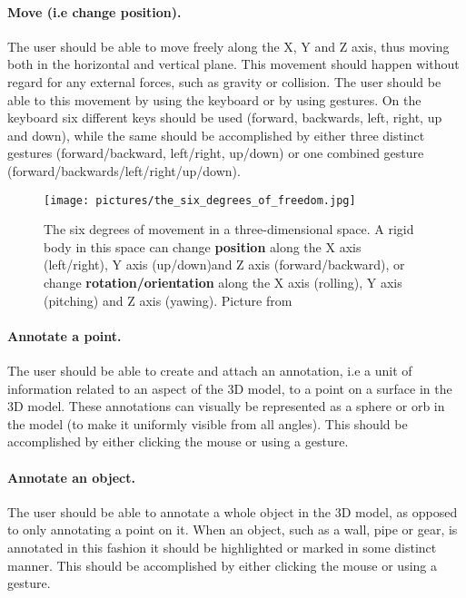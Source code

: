 \paragraph{Move (i.e change position).} The user should be able to move freely along the X, Y and Z axis, thus moving both in the horizontal and vertical plane. 
This movement should happen without regard for any external forces, such as gravity or collision. The user should be able to this movement by using the keyboard or 
by using gestures. On the keyboard six different keys should be used (forward, backwards, left, right, up and down), while the same should be accomplished by
either three distinct gestures (forward/backward, left/right, up/down) or one combined gesture (forward/backwards/left/right/up/down).

\begin{figure}%
	\texttt{[image: pictures/the\_six\_degrees\_of\_freedom.jpg]}
	\caption[The six degrees of freedom]{The six degrees of movement in a three-dimensional space. A rigid body in this space can change \textbf{position} along the X axis (left/right), 
	Y axis (up/down)and Z axis (forward/backward), or change \textbf{rotation/orientation} along the X axis (rolling), Y axis (pitching) and Z axis (yawing).
	Picture from \citet{6DOF}}
	\label{fig:the_six_degrees_of_freedom}
\end{figure} 

\paragraph{Annotate a point.} The user should be able to create and attach an annotation, i.e a unit of information related to an aspect of the 3D model, to a point on a surface in
the 3D model. These annotations can visually be represented as a sphere or orb in the model (to make it uniformly visible from all angles). This should be accomplished by
either clicking the mouse or using a gesture. 

\paragraph{Annotate an object.} The user should be able to annotate a whole object in the 3D model, as opposed to only annotating a point on it. When an object, such
as a wall, pipe or gear, is annotated in this fashion it should be highlighted or marked in some distinct manner. This should be accomplished by
either clicking the mouse or using a gesture. 

